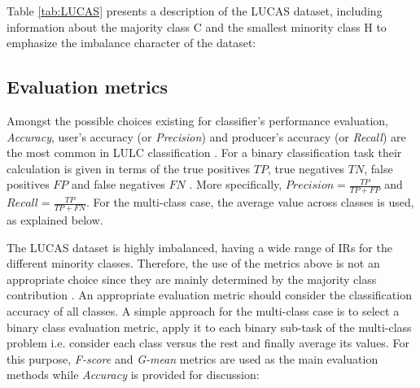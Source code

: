 \documentclass[remotesensing,article,submit,moreauthors,pdftex]{Definitions/mdpi}
\begin{document}
Table \ref{tab:LUCAS} presents a description of the LUCAS dataset, including
information about the majority class C and the smallest minority class H to
emphasize the imbalance character of the dataset:


\subsection{Evaluation metrics}  \label{Evaluation metrics}

Amongst the possible choices existing for classifier's performance evaluation,
\textit{Accuracy}, user's accuracy (or \textit{Precision}) and
producer's accuracy (or \textit{Recall}) are the most common in LULC
classification \cite{Liu2007, Olofsson2013}. For a binary classification task
their calculation is given in terms of the true positives \( TP \), true
negatives \(TN \), false positives \( FP \) and false negatives \( FN \)
\cite{Liu2007}. More specifically,  \( \textit{Precision} =  \frac{TP}{TP + FP}
\) and \(\textit{Recall} =  \frac{TP}{TP + FN} \). For the multi-class case, the
average value across classes is used, as explained below.

The LUCAS dataset is highly imbalanced, having a wide range of IRs for the
different minority classes. Therefore, the use of the metrics above is not an
appropriate choice since they are mainly determined by the majority class
contribution \cite{He2009}. An appropriate evaluation metric should consider the
classification accuracy of all classes. A simple approach for the multi-class
case is to select a binary class evaluation metric, apply it to each binary
sub-task of the multi-class problem i.e. consider each class versus the rest and
finally average its values. For this purpose, \textit{F-score} and
\textit{G-mean} metrics are used as the main evaluation methods while
\textit{Accuracy} is provided for discussion:
\end{document}
